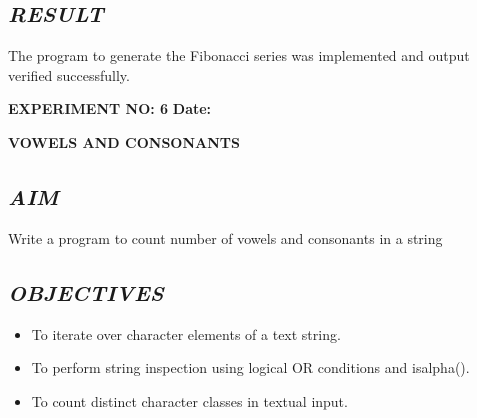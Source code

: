 \documentclass[11pt,a4paper]{article}
\begin{document}
\subsection*{\textit{RESULT}}
The program to generate the Fibonacci series was implemented and output verified successfully.

\newpage

\noindent
\textbf{\large EXPERIMENT NO: 6} \hfill \textbf{\large Date: \underline{\hspace{3cm}}}

\vspace{0.2cm}
\begin{center}
{\Huge \textbf{\textcolor{navyblue}{VOWELS AND CONSONANTS}}}
\end{center}
\vspace{0.3cm}

\subsection*{\textit{AIM}}
Write a program to count number of vowels and consonants in a string

\subsection*{\textit{OBJECTIVES}}
\begin{itemize}
  \item To iterate over character elements of a text string.
  \item To perform string inspection using logical OR conditions and isalpha().
  \item To count distinct character classes in textual input.
\end{itemize}
\end{document}
